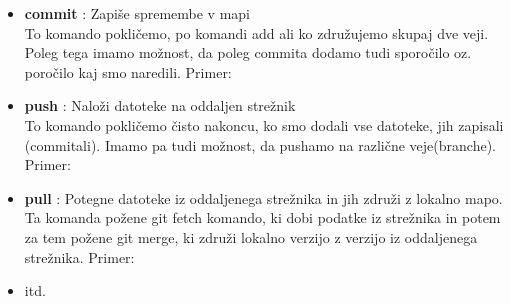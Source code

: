 \begin{itemize}
	\item \textbf{commit} : Zapiše spremembe v mapi\\
	To komando pokličemo, po komandi add ali ko združujemo skupaj dve veji. Poleg tega imamo možnost, da poleg commita dodamo tudi sporočilo oz. poročilo kaj smo naredili. Primer:\\
	\item \textbf{push} : Naloži datoteke na oddaljen strežnik\\
	To komando pokličemo čisto nakoncu, ko smo dodali vse datoteke, jih zapisali (commitali). Imamo pa tudi možnost, da pushamo na različne veje(branche).\\
	Primer:\\
	\item \textbf{pull} : Potegne datoteke iz oddaljenega strežnika in jih združi z lokalno mapo.\\
	Ta komanda požene git fetch komando, ki dobi podatke iz strežnika in potem za tem požene git merge, ki združi lokalno verzijo z verzijo iz oddaljenega strežnika.
	Primer:\\
	\item itd.
\end{itemize}


